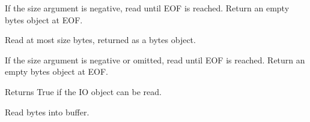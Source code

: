 \documentclass[letterpaper,10pt,english]{sphinxmanual}
\begin{document}
\begin{fulllineitems}
\begin{fulllineitems}
\sphinxAtStartPar
If the size argument is negative, read until EOF is reached.
Return an empty bytes object at EOF.

\end{fulllineitems}


\begin{fulllineitems}
\label{\detokenize{modules/src.pig_sorting_api.main:src.pig_sorting_api.main.BytesIO.read1}}
\pysigstartsignatures
\pysiglinewithargsret
{}
{\sphinxparamcomma {}}
{}
\pysigstopsignatures
\sphinxAtStartPar
Read at most size bytes, returned as a bytes object.

\sphinxAtStartPar
If the size argument is negative or omitted, read until EOF is reached.
Return an empty bytes object at EOF.

\end{fulllineitems}


\begin{fulllineitems}
\label{\detokenize{modules/src.pig_sorting_api.main:src.pig_sorting_api.main.BytesIO.readable}}
\pysigstartsignatures
\pysiglinewithargsret
{}
{}
{}
\pysigstopsignatures
\sphinxAtStartPar
Returns True if the IO object can be read.

\end{fulllineitems}


\begin{fulllineitems}
\label{\detokenize{modules/src.pig_sorting_api.main:src.pig_sorting_api.main.BytesIO.readinto}}
\pysigstartsignatures
\pysiglinewithargsret
{}
{\sphinxparamcomma {}}
{}
\pysigstopsignatures
\sphinxAtStartPar
Read bytes into buffer.


\end{fulllineitems}
\end{fulllineitems}
\end{document}

